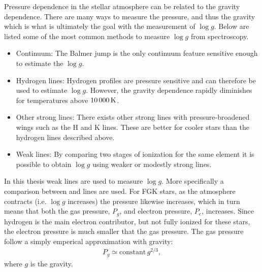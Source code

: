 Pressure dependence in the stellar atmosphere can be related to the gravity
dependence. There are many ways to measure the pressure, and thus the gravity
which is what is ultimately the goal with the measurement of $\log g$. Below are
listed some of the most common methods to measure $\log g$ from spectroscopy.

\begin{itemize}
  \item Continuum: The Balmer jump is the only continuum feature sensitive
        enough to estimate the $\log g$.
  \item Hydrogen lines: Hydrogen profiles are pressure sensitive and can
        therefore be used to estimate $\log g$. However, the gravity dependence
        rapidly diminishes for temperatures above $\SI{10\,000}{K}$.
  \item Other strong lines: There exists other strong lines with
        pressure-broadened wings such as the  H and K lines. These
        are better for cooler stars than the hydrogen lines described above.
  \item Weak lines: By comparing two stages of ionization for the same element
        it is possible to obtain $\log g$ using weaker or modestly strong lines.
\end{itemize}
In this thesis weak lines are used to measure $\log g$. More specifically a
comparison between  and  lines are used. For FGK stars,
as the atmosphere contracts (i.e. $\log g$ increases) the pressure likewise
increases, which in turn means that both the gas pressure, $P_g$, and electron
pressure, $P_e$, increases. Since hydrogen is the main electron contributor, but
not fully ionized for these stars, the electron pressure is much smaller that
the gas pressure. The gas pressure follow a simply emperical approximation with
gravity:
\begin{align}
  P_g \simeq \mathrm{constant}\, g^{2/3},
\end{align}
where $g$ is the gravity.



